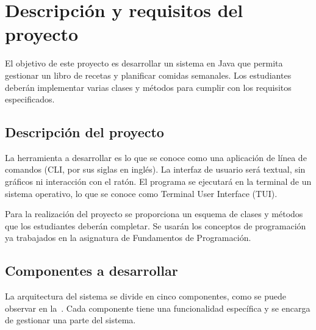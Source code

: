 \documentclass[
    a4paper, %
    12pt, %
]{CSSullivanBusinessReport}
\begin{document}
\section{Descripción y requisitos del proyecto}
El objetivo de este proyecto es desarrollar un sistema en Java que permita gestionar un libro de recetas y planificar comidas semanales. Los estudiantes deberán implementar varias clases y métodos para cumplir con los requisitos especificados.

\subsection{Descripción del proyecto}
La herramienta a desarrollar es lo que se conoce como una aplicación de línea de comandos (CLI, por sus siglas en inglés). La interfaz de usuario será textual, sin gráficos ni interacción con el ratón. El programa se ejecutará en la terminal de un sistema operativo, lo que se conoce como Terminal User Interface (TUI).

Para la realización del proyecto se proporciona un esquema de clases y métodos que los estudiantes deberán completar. Se usarán los conceptos de programación ya trabajados en la asignatura de Fundamentos de Programación.

\subsection{Componentes a desarrollar}



La arquitectura del sistema se divide en cinco componentes, como se puede observar en la~. Cada componente tiene una funcionalidad específica y se encarga de gestionar una parte del sistema.
\end{document}
